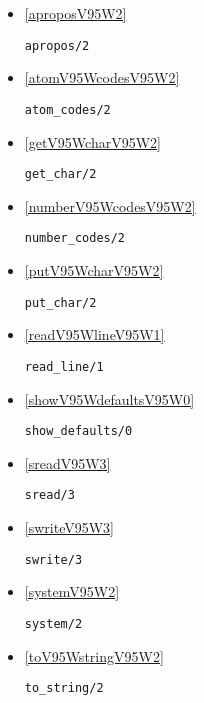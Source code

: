 \begin{itemize}
\item \ref{aproposV95W2} 
\begin{verbatim}
apropos/2
\end{verbatim}

\item \ref{atomV95WcodesV95W2} 
\begin{verbatim}
atom_codes/2
\end{verbatim}

\item \ref{getV95WcharV95W2} 
\begin{verbatim}
get_char/2
\end{verbatim}

\item \ref{numberV95WcodesV95W2} 
\begin{verbatim}
number_codes/2
\end{verbatim}

\item \ref{putV95WcharV95W2} 
\begin{verbatim}
put_char/2
\end{verbatim}

\item \ref{readV95WlineV95W1} 
\begin{verbatim}
read_line/1
\end{verbatim}

\item \ref{showV95WdefaultsV95W0} 
\begin{verbatim}
show_defaults/0
\end{verbatim}

\item \ref{sreadV95W3} 
\begin{verbatim}
sread/3
\end{verbatim}

\item \ref{swriteV95W3} 
\begin{verbatim}
swrite/3
\end{verbatim}

\item \ref{systemV95W2} 
\begin{verbatim}
system/2
\end{verbatim}

\item \ref{toV95WstringV95W2} 
\begin{verbatim}
to_string/2
\end{verbatim}

\end{itemize}

